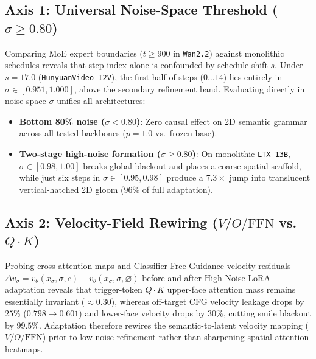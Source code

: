 \documentclass[10pt,twocolumn,letterpaper]{article}
\begin{document}
\subsection{Axis 1: Universal Noise-Space Threshold ($\sigma \ge 0.80$)}
Comparing MoE expert boundaries ($t \ge 900$ in \texttt{Wan2.2}) against monolithic schedules reveals that step index alone is confounded by schedule shift $s$. Under $s=17.0$ (\texttt{HunyuanVideo-I2V}), the first half of steps ($0\dots 14$) lies entirely in $\sigma \in [0.951, 1.000]$, above the secondary refinement band. Evaluating directly in noise space $\sigma$ unifies all architectures:
\begin{itemize}
    \item \textbf{Bottom 80\% noise ($\sigma < 0.80$)}: Zero causal effect on 2D semantic grammar across all tested backbones ($p=1.0$ vs.\ frozen base).
    \item \textbf{Two-stage high-noise formation ($\sigma \ge 0.80$)}: On monolithic \texttt{LTX-13B}, $\sigma \in [0.98, 1.00]$ breaks global blackout and places a coarse spatial scaffold, while just six steps in $\sigma \in [0.95, 0.98]$ produce a $7.3\times$ jump into translucent vertical-hatched 2D gloom (96\% of full adaptation).
\end{itemize}

\subsection{Axis 2: Velocity-Field Rewiring ($V/O/\text{FFN}$ vs.\ $Q\cdot K$)}
Probing cross-attention maps and Classifier-Free Guidance velocity residuals $\Delta v_\sigma = v_\theta(x_\sigma, \sigma, c) - v_\theta(x_\sigma, \sigma, \varnothing)$ before and after High-Noise LoRA adaptation reveals that trigger-token $Q\cdot K$ upper-face attention mass remains essentially invariant ($\approx 0.30$), whereas off-target CFG velocity leakage drops by $25\%$ ($0.798 \to 0.601$) and lower-face velocity drops by $30\%$, cutting smile blackout by $99.5\%$. Adaptation therefore rewires the semantic-to-latent velocity mapping ($V/O/\text{FFN}$) prior to low-noise refinement rather than sharpening spatial attention heatmaps.
\end{document}
